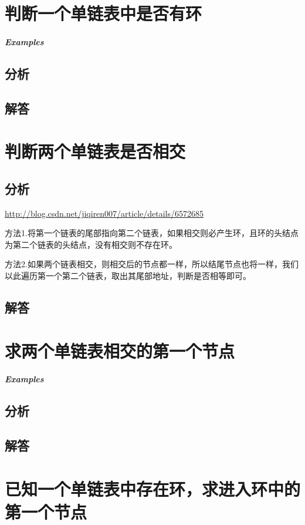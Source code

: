 \documentclass[UTF8,a4paper,12pt]{ctexbook}
\begin{document}
	
\section{判断一个单链表中是否有环}
	
	\subparagraph{Examples}
	
	\subsection{分析}
	
	\subsection{解答}
	
	
\section{判断两个单链表是否相交}
	
	\subsection{分析}
		\url{http://blog.csdn.net/jiqiren007/article/details/6572685}
		
		方法1.将第一个链表的尾部指向第二个链表，如果相交则必产生环，且环的头结点为第二个链表的头结点，没有相交则不存在环。 
		
		方法2.如果两个链表相交，则相交后的节点都一样，所以结尾节点也将一样，我们以此遍历第一个第二个链表，取出其尾部地址，判断是否相等即可。
	\subsection{解答}
	
	
\section{求两个单链表相交的第一个节点}
	
	\subparagraph{Examples}
	
	\subsection{分析}
	
	\subsection{解答}
	
	
\section{已知一个单链表中存在环，求进入环中的第一个节点}
	
\end{document}
